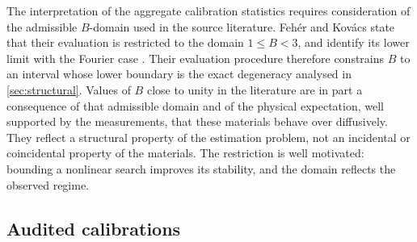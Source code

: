 \documentclass[preprint,12pt,a4paper]{elsarticle}
\theoremstyle{plain}
\theoremstyle{definition}
\theoremstyle{remark}
\newcommand{\Bnum}{B}
\begin{document}
The interpretation of the aggregate calibration statistics requires
consideration of the admissible $\Bnum$-domain used in the source literature.
Feh\'er and Kov\'acs state that their
evaluation is restricted to the domain $1 \leq \Bnum < 3$, and identify its
lower limit with the Fourier case
\cite{FeherKovacs2021}. Their evaluation procedure therefore constrains
$\Bnum$ to an interval whose lower boundary is the exact degeneracy analysed in
\cref{sec:structural}. Values of $\Bnum$ close to unity in the literature are
in part a consequence of that admissible domain and of the physical
expectation, well supported by the measurements, that these materials behave
over diffusively. They reflect a structural property of the estimation
problem, not an incidental or coincidental property of the materials. The
restriction is well motivated: bounding a nonlinear search improves its
stability, and the domain reflects the observed regime.

\subsection{Audited calibrations}
\label{sec:cal-audit}
\end{document}

